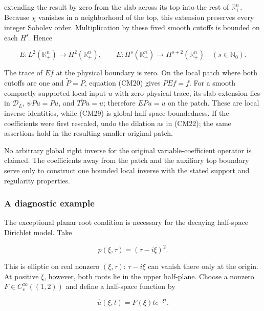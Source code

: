 \documentclass[
  11pt,
]{article}
\makeatletter
\let\ReaderOriginalAnchorStart\hyper@anchorstart
\let\ReaderOriginalAnchorEnd\hyper@anchorend
\let\ReaderPendingAliases\@empty
\def\ReaderArmAliases#1{\gdef\ReaderPendingAliases{#1}}
\def\hyper@anchorstart#1{\ReaderIfNativeAnchorTF{#1}{\ReaderPendingAliases\global\let\ReaderPendingAliases\@empty}{}\ReaderOriginalAnchorStart{#1}}
\makeatother
\begin{document}
extending the result by zero from the slab across its top into the rest
of \(\mathbb R^n_+\). Because \(\chi\) vanishes in a neighborhood of the
top, this extension preserves every integer Sobolev order.
Multiplication by these fixed smooth cutoffs is bounded on each \(H^s\).
Hence

\[
E:L^2(\mathbb R^n_+)\longrightarrow H^2(\mathbb R^n_+),
\qquad E:H^s(\mathbb R^n_+)\longrightarrow H^{s+2}(\mathbb R^n_+)
\quad(s\in\mathbb N_0).
\tag{CM29}
\]

The trace of \(Ef\) at the physical boundary is zero. On the local patch
where both cutoffs are one and \(\widetilde P=P\), equation (CM20) gives
\(PEf=f\). For a smooth compactly supported local input \(u\) with zero
physical trace, its slab extension lies in \(\mathcal D_L\),
\(\psi Pu=Pu\), and \(T\widetilde Pu=u\); therefore \(EPu=u\) on the
patch. These are local inverse identities, while (CM29) is global
half-space boundedness. If the coefficients were first rescaled, undo
the dilation as in (CM22); the same assertions hold in the resulting
smaller original patch.

No arbitrary global right inverse for the original variable-coefficient
operator is claimed. The coefficients away from the patch and the
auxiliary top boundary serve only to construct one bounded local inverse
with the stated support and regularity properties.

\ReaderArmAliases{\ReaderOriginalAnchorStart{an-original-diagnostic-example}\ReaderOriginalAnchorEnd\begingroup\expandafter\def\csname @currentHref\endcsname{an-original-diagnostic-example}\label{an-original-diagnostic-example}\endgroup\ReaderOriginalAnchorStart{a-diagnostic-example}\ReaderOriginalAnchorEnd}
\subsubsection{A diagnostic example}\label{a-diagnostic-example}

The exceptional planar root condition is necessary for the decaying
half-space Dirichlet model. Take

\[
p(\xi,\tau)=(\tau-i\xi)^2.
\]

This is elliptic on real nonzero \((\xi,\tau)\): \(\tau-i\xi\) can
vanish there only at the origin. At positive \(\xi\), however, both
roots lie in the upper half-plane. Choose a nonzero
\(F\in C_c^\infty((1,2))\) and define a half-space function by

\[
\widehat u(\xi,t)=F(\xi)t e^{-\xi t}.
\]
\end{document}
